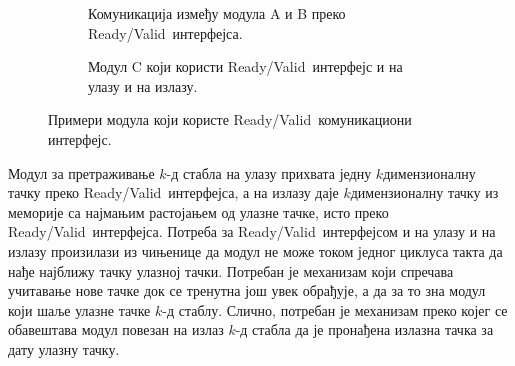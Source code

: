 \documentclass[master]{finthesis}
\newcommand*{\kdim}[1]{\texorpdfstring{$k$\Hyphdash}{k-}димензионал#1}
\newcommand*{\kd}{\texorpdfstring{$k$}{k}-д }
\newcommand*{\correctmath}[1]{%
    \ifcsname mathCorrectionFor#1\endcsname%
        \csname mathCorrectionFor#1\endcsname%
    \else%
        #1%
    \fi%
}
\newcommand*{\mfield}[1]{{\langle\correctmath{#1}\/\rangle}}
\newcommand*{\field}[1]{\texorpdfstring{$\mfield{#1}$}{⟨#1⟩}}
\newcommand{\rv}{Ready\slash Valid}
\begin{document}
\begin{figure}[ht]
    \begin{subfigure}[b]{0.48\linewidth}
        \centering
        \caption{Комуникација између модула A и B преко \rv\ интерфејса.}
        \label{fig:readyvalid:link}
    \end{subfigure}
    \hfill
    \begin{subfigure}[b]{0.48\linewidth}
        \centering
        \caption{Модул C који користи \rv\ интерфејс и на улазу и на излазу.}
        \label{fig:readyvalid:module}
    \end{subfigure}
    
    \caption{Примери модула који користе \rv\ комуникациони интерфејс.}
    \label{fig:my_label}
\end{figure}

Модул за претраживање \kd стабла на улазу прихвата једну \kdim{ну} тачку преко \rv\ интерфејса, а на излазу даје \kdim{ну} тачку из меморије са најмањим растојањем од улазне тачке, исто преко \rv\ интерфејса. Потреба за \rv\ интерфејсом и на улазу и на излазу произилази из чињенице да модул не може током једног циклуса такта да нађе најближу тачку улазној тачки. Потребан је механизам који спречава учитавање нове тачке док се тренутна још увек обрађује, а да за то зна модул који шаље улазне тачке \kd стаблу. Слично, потребан је механизам преко којег се обавештава модул повезан на излаз \kd стабла да је пронађена излазна тачка за дату улазну тачку.
\end{document}
